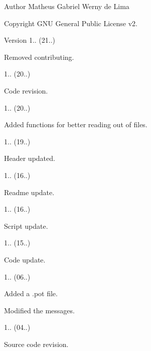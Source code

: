 \begin{DoxyAuthor}{Author}
Matheus Gabriel Werny de Lima 
\end{DoxyAuthor}
\begin{DoxyCopyright}{Copyright}
G\+NU General Public License v2. 
\end{DoxyCopyright}
\begin{DoxyVersion}{Version}
1.. (21..)
\begin{DoxyItemize}
\item Removed contributing. 
\end{DoxyItemize}

1.. (20..)
\begin{DoxyItemize}
\item Code revision. 
\end{DoxyItemize}

1.. (20..)
\begin{DoxyItemize}
\item Added functions for better reading out of files. 
\end{DoxyItemize}

1.. (19..)
\begin{DoxyItemize}
\item Header updated. 
\end{DoxyItemize}

1.. (16..)
\begin{DoxyItemize}
\item Readme update. 
\end{DoxyItemize}

1.. (16..)
\begin{DoxyItemize}
\item Script update. 
\end{DoxyItemize}

1.. (15..)
\begin{DoxyItemize}
\item Code update. 
\end{DoxyItemize}

1.. (06..)
\begin{DoxyItemize}
\item Added a .pot file.
\item Modified the messages. 
\end{DoxyItemize}

1.. (04..)
\begin{DoxyItemize}
\item Source code revision. 
\end{DoxyItemize}


\end{DoxyVersion}
